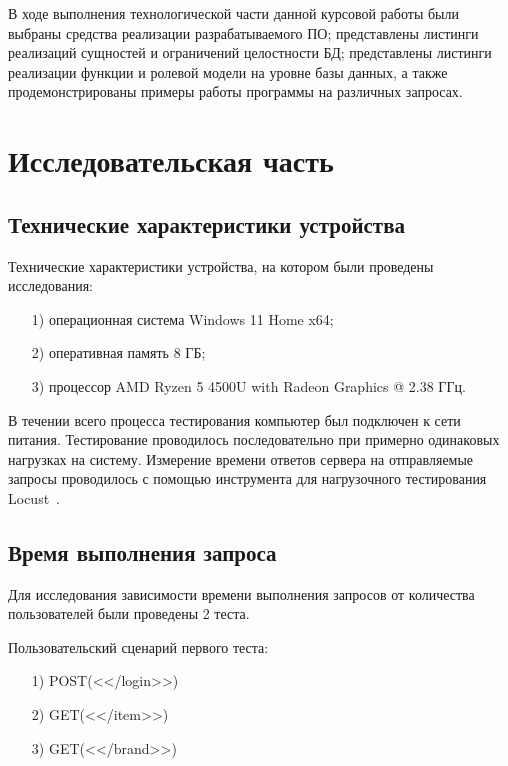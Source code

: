 \documentclass{bmstu}
\begin{document}
В ходе выполнения технологической части данной курсовой работы были выбраны средства реализации разрабатываемого ПО; представлены листинги реализаций сущностей и ограничений целостности БД; представлены листинги реализации функции и ролевой модели на уровне базы данных, а также продемонстрированы примеры работы программы на различных запросах.

\chapter{Исследовательская часть}

\section{Технические характеристики устройства}

Технические характеристики устройства, на котором были проведены исследования:

\begin{enumerate}
\item[1)]
операционная система Windows 11 Home x64;
\item[2)]
оперативная память 8 ГБ;
\item[3)]
процессор AMD Ryzen 5 4500U with Radeon Graphics @ 2.38 ГГц.
\end{enumerate}

В течении всего процесса тестирования компьютер был подключен к сети питания. Тестирование проводилось последовательно при примерно одинаковых нагрузках на систему. Измерение времени ответов сервера на отправляемые запросы проводилось с помощью инструмента для нагрузочного тестирования Locust~\cite{Locust}.

\section{Время выполнения запроса}

Для исследования зависимости времени выполнения запросов от количества пользователей были проведены 2 теста.

Пользовательский сценарий первого теста:

\begin{enumerate}
	\item[1)]
	POST(<</login>>)
	\item[2)]
	GET(<</item>>)
	\item[3)]
	GET(<</brand>>)
\end{enumerate}
\end{document}
